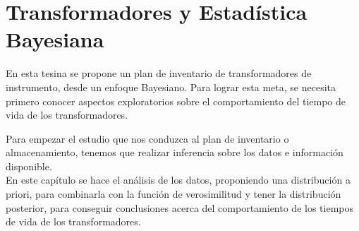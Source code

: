 
\chapter{Transformadores y Estad\'istica Bayesiana}

\noindent En esta tesina se propone un plan de inventario de transformadores de instrumento,
 desde un enfoque Bayesiano. Para lograr esta meta, se necesita primero conocer aspectos exploratorios sobre el comportamiento del tiempo de  vida de los transformadores.  
 
 
\noindent Para empezar el estudio que nos conduzca al plan de inventario o almacenamiento, tenemos que realizar inferencia 
sobre los datos e informaci\'on disponible.\\[0.1cm] 
En este cap\'itulo se hace el an\'alisis de los datos,  proponiendo 
una distribuci\'on a priori, para combinarla con la funci\'on de verosimilitud y tener la distribuci\'on 
posterior, para conseguir conclusiones acerca del comportamiento de los tiempos de vida de
los transformadores.


